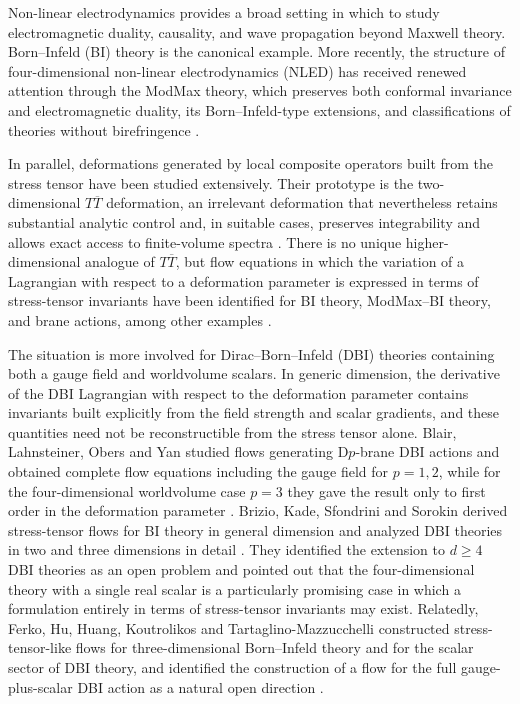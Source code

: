 \documentclass[a4paper,11pt]{article}
\numberwithin{equation}{section}
\begin{document}
Non-linear electrodynamics provides a broad setting in which to study electromagnetic duality, causality, and wave propagation beyond Maxwell theory. Born--Infeld (BI) theory is the canonical example. More recently, the structure of four-dimensional non-linear electrodynamics (NLED) has received renewed attention through the ModMax theory, which preserves both conformal invariance and electromagnetic duality, its Born--Infeld-type extensions, and classifications of theories without birefringence \cite{BornInfeld1934,Bandos2020,Sorokin2021,Ferko2023Birefringence,Ferko2023Duality}.

In parallel, deformations generated by local composite operators built from the stress tensor have been studied extensively. Their prototype is the two-dimensional $T\overline T$ deformation, an irrelevant deformation that nevertheless retains substantial analytic control and, in suitable cases, preserves integrability and allows exact access to finite-volume spectra \cite{SmirnovZamolodchikov2016}. There is no unique higher-dimensional analogue of $T\overline T$, but flow equations in which the variation of a Lagrangian with respect to a deformation parameter is expressed in terms of stress-tensor invariants have been identified for BI theory, ModMax--BI theory, and brane actions, among other examples \cite{Taylor2018,Babaei2022,Ferko2022,Conti2022,Ferko2023Duality,Brizio2026}.

The situation is more involved for Dirac--Born--Infeld (DBI) theories containing both a gauge field and worldvolume scalars. In generic dimension, the derivative of the DBI Lagrangian with respect to the deformation parameter contains invariants built explicitly from the field strength and scalar gradients, and these quantities need not be reconstructible from the stress tensor alone. Blair, Lahnsteiner, Obers and Yan studied flows generating D$p$-brane DBI actions and obtained complete flow equations including the gauge field for $p=1,2$, while for the four-dimensional worldvolume case $p=3$ they gave the result only to first order in the deformation parameter \cite{Blair2025}. Brizio, Kade, Sfondrini and Sorokin derived stress-tensor flows for BI theory in general dimension and analyzed DBI theories in two and three dimensions in detail \cite{Brizio2026}. They identified the extension to $d\geq4$ DBI theories as an open problem and pointed out that the four-dimensional theory with a single real scalar is a particularly promising case in which a formulation entirely in terms of stress-tensor invariants may exist. Relatedly, Ferko, Hu, Huang, Koutrolikos and Tartaglino-Mazzucchelli constructed stress-tensor-like flows for three-dimensional Born--Infeld theory and for the scalar sector of DBI theory, and identified the construction of a flow for the full gauge-plus-scalar DBI action as a natural open direction \cite{Ferko2024DBI}.
\end{document}
